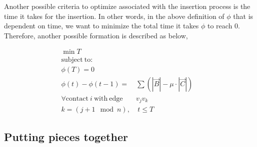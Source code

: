 Another possible criteria to optimize associated with the insertion process is the time it takes for the insertion. In other words, in the above definition of $\phi$ that is dependent on time, we want to minimize the total time it takes $\phi$ to reach $0$. Therefore, another possible formation is described as below, 

\begin{eqnarray}
\min T &\\
\mathrm{subject\ to: }&\nonumber\\
\phi(T) = 0&\\
\phi(t) - \phi(t-1) =& \sum(|\overrightarrow{B}| - \mu\cdot |\overrightarrow{C}|)\\
\forall\mathrm{contact\ } i\mathrm{\ with\ edge\ }& v_jv_k\\
k=(j+1\mod n),&\ t\leq T&\nonumber
\end{eqnarray}


\subsection{Putting pieces together}





